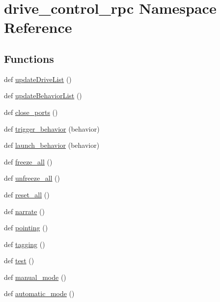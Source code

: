 \hypertarget{namespacedrive__control__rpc}{}\section{drive\+\_\+control\+\_\+rpc Namespace Reference}
\label{namespacedrive__control__rpc}
\subsection*{Functions}
\begin{DoxyCompactItemize}
\item 
def \hyperlink{namespacedrive__control__rpc_a086ccfe34cfe1eb3440cadb2f10b0f08}{update\+Drive\+List} ()
\item 
def \hyperlink{namespacedrive__control__rpc_aece99fd3dbbafdb0808eb837b038eaa5}{update\+Behavior\+List} ()
\item 
def \hyperlink{namespacedrive__control__rpc_a138e6e7b4cd44479e427c0c3dd533e3e}{close\+\_\+ports} ()
\item 
def \hyperlink{namespacedrive__control__rpc_a5e7562b93aab63c234f56a91507cf3b0}{trigger\+\_\+behavior} (behavior)
\item 
def \hyperlink{namespacedrive__control__rpc_aae666e8d207e9e50bf7129f0c2271874}{launch\+\_\+behavior} (behavior)
\item 
def \hyperlink{namespacedrive__control__rpc_a0a92b8da37cc8d9d2d4910ceecf1b508}{freeze\+\_\+all} ()
\item 
def \hyperlink{namespacedrive__control__rpc_a27b4d4d77509f5fd0124fc18b0104de9}{unfreeze\+\_\+all} ()
\item 
def \hyperlink{namespacedrive__control__rpc_a8f61b938d2a8ea371c72117f123841d3}{reset\+\_\+all} ()
\item 
def \hyperlink{namespacedrive__control__rpc_a5f11fca03a0e794d62e61ec5cf1d890c}{narrate} ()
\item 
def \hyperlink{namespacedrive__control__rpc_a276bd344b00a65b4a41241ce49cff801}{pointing} ()
\item 
def \hyperlink{namespacedrive__control__rpc_abe2d88b19ce544598171e788d121086f}{tagging} ()
\item 
def \hyperlink{namespacedrive__control__rpc_af880c1ea22f666df4c3d5fabaec29a80}{test} ()
\item 
def \hyperlink{namespacedrive__control__rpc_ae223cba1fab85e14b18fcd496a95bd34}{manual\+\_\+mode} ()
\item 
def \hyperlink{namespacedrive__control__rpc_a6ea3bba1adfb89a680efa7ebc81e04ed}{automatic\+\_\+mode} ()
\end{DoxyCompactItemize}
